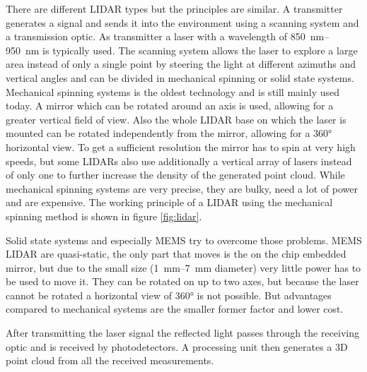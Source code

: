 There are different LIDAR types but the principles are similar.
A transmitter generates a signal and sends it into the environment using a scanning system and a transmission optic.
As transmitter a laser with a wavelength of \SIrange{850}{950}{\nano\metre} is typically used.
The scanning system allows the laser to explore a large area instead of only a single point by steering the light at different azimuths and vertical angles and can be divided in mechanical spinning or solid state systems.
Mechanical spinning systems is the oldest technology and is still mainly used today.
A mirror which can be rotated around an axis is used, allowing for a greater vertical field of view.
Also the whole LIDAR base on which the laser is mounted can be rotated independently from the mirror, allowing for a 360° horizontal view.
To get a sufficient resolution the mirror has to spin at very high speeds, but some LIDARs also use additionally a vertical array of lasers instead of only one to further increase the density of the generated point cloud.
While mechanical spinning systems are very precise, they are bulky, need a lot of power and are expensive.
The working principle of a LIDAR using the mechanical spinning method is shown in figure \ref{fig:lidar}.

Solid state systems and especially MEMS try to overcome those problems.
MEMS LIDAR are quasi-static, the only part that moves is the on the chip embedded mirror, but due to the small size (\SIrange{1}{7}{\milli\metre} diameter) very little power has to be used to move it.
They can be rotated on up to two axes, but because the laser cannot be rotated a horizontal view of 360° is not possible.
But advantages compared to mechanical systems are the smaller former factor and lower cost.

After transmitting the laser signal the reflected light passes through the receiving optic and is received by photodetectors.
A processing unit then generates a 3D point cloud from all the received measurements.

\cite{Wang2020}
\cite{Vaughan2006}


